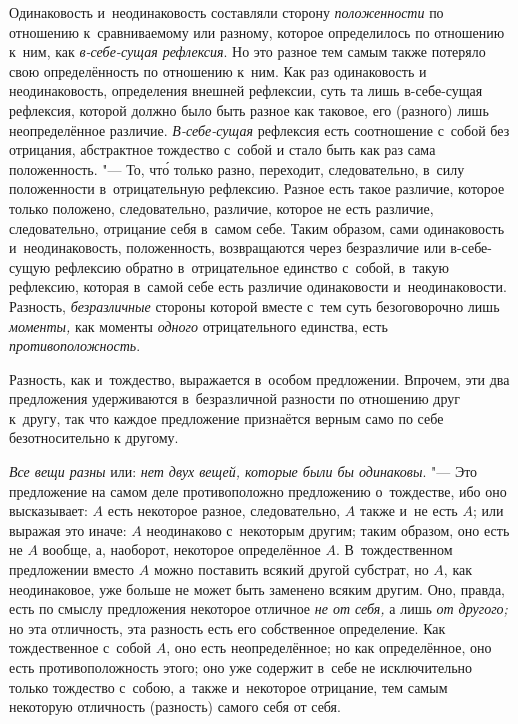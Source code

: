 Одинаковость и~неодинаковость составляли сторону
{\em положенности} по отношению к~сравниваемому или
разному, которое определилось по отношению к~ним, как
{\em в-себе-сущая рефлексия}. Но это разное тем самым
также потеряло свою определённость по отношению к~ним. Как раз одинаковость
и неодинаковость, определения внешней рефлексии, суть та лишь в-себе-сущая
рефлексия, которой должно было быть разное как таковое, его (разного) лишь
неопределённое различие. {\em В-себе-сущая} рефлексия
есть соотношение с~собой без отрицания, абстрактное тождество с~собой и
стало быть как раз сама положенность. "--- То, чт\'{о} только разно, переходит,
следовательно, в~силу положенности в~отрицательную рефлексию. Разное есть
такое различие, которое только положено, следовательно, различие, которое
не есть различие, следовательно, отрицание себя в~самом себе. Таким
образом, сами одинаковость и~неодинаковость, положенность, возвращаются
через безразличие или в-себе-сущую рефлексию обратно в~отрицательное
единство с~собой, в~такую рефлексию, которая в~самой себе есть различие
одинаковости и~неодинаковости. Разность,
{\em безразличные} стороны которой вместе с~тем суть
безоговорочно лишь {\em моменты,} как моменты
{\em одного} отрицательного единства, есть {\em противоположность}.


Разность, как и~тождество, выражается в~особом предложении. Впрочем, эти два
предложения удерживаются в~безразличной разности по отношению друг к~другу,
так что каждое предложение признаётся верным само по себе безотносительно к
другому.

{\em Все вещи разны} или: {\em нет
двух вещей, которые были бы одинаковы}. "--- Это предложение на самом деле
противоположно предложению о~тождестве, ибо оно высказывает: $A$
есть некоторое разное, следовательно, $A$ также и~не есть
$A$; или выражая это иначе: $A$ неодинаково с~некоторым
другим; таким образом, оно есть не $A$ вообще, а, наоборот,
некоторое определённое $A$. В~тождественном предложении вместо
$A$ можно поставить всякий другой субстрат, но $A$, как
неодинаковое, уже больше не может быть заменено всяким другим. Оно, правда,
есть по смыслу предложения некоторое отличное {\em не от себя,}
а лишь {\em от другого;} но эта отличность,
эта разность есть его собственное определение. Как тождественное с~собой
$A$, оно есть неопределённое; но как определённое, оно есть
противоположность этого; оно уже содержит в~себе не исключительно только
тождество с~собою, а~также и~некоторое отрицание, тем самым некоторую
отличность (разность) самого себя от себя.


